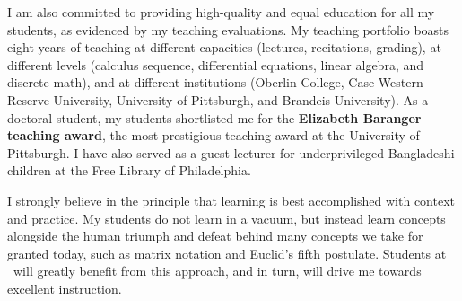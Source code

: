 I am also committed to providing high-quality and equal education for all my students, as evidenced by my teaching evaluations. My teaching portfolio boasts eight years of teaching at different capacities (lectures, recitations, grading), at different levels (calculus sequence, differential equations, linear algebra, and discrete math), and at different institutions (Oberlin College, Case Western Reserve University, University of Pittsburgh, and Brandeis University). As a doctoral student, my students shortlisted me for the \textbf{Elizabeth Baranger teaching award}, the most prestigious teaching award at the University of Pittsburgh. I have also served as a guest lecturer for underprivileged Bangladeshi children at the Free Library of Philadelphia.

I strongly believe in the principle that learning is best accomplished with context and practice. My students do not learn in a vacuum, but instead learn concepts alongside the human triumph and defeat behind many concepts we take for granted today, such as matrix notation and Euclid's fifth postulate. Students at \School~will greatly benefit from this approach, and in turn, will drive me towards excellent instruction.